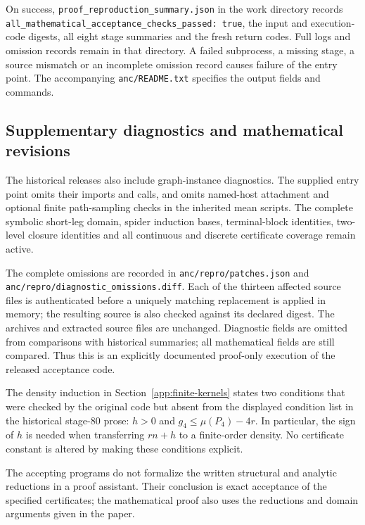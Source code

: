 On success, \nolinkurl{proof_reproduction_summary.json} in the work
directory records
\nolinkurl{all_mathematical_acceptance_checks_passed: true}, the input
and execution-code digests, all eight stage summaries and the fresh
return codes. Full logs and omission records remain in that directory.
A failed subprocess, a missing stage, a source mismatch or an incomplete
omission record causes failure of the entry point. The accompanying
\nolinkurl{anc/README.txt} specifies the output fields and commands.

\subsection{Supplementary diagnostics and mathematical revisions}
The historical releases also include graph-instance diagnostics. The
supplied entry point omits their imports and calls, and omits named-host
attachment and optional finite path-sampling checks in the inherited
mean scripts. The complete symbolic short-leg domain, spider induction
bases, terminal-block identities, two-level closure identities and all
continuous and discrete certificate coverage remain active.

The complete omissions are recorded in
\nolinkurl{anc/repro/patches.json} and
\nolinkurl{anc/repro/diagnostic_omissions.diff}. Each of the thirteen
affected source files is authenticated before a uniquely matching
replacement is applied in memory; the resulting source is also checked
against its declared digest. The archives and extracted source files
are unchanged. Diagnostic fields are omitted from comparisons with
historical summaries; all mathematical fields are still compared.
Thus this is an explicitly documented proof-only execution of the
released acceptance code.

The density induction in Section~\ref{app:finite-kernels} states two
conditions that were checked by the original code but absent from the
displayed condition list in the historical stage-80 prose:
$h>0$ and $g_4\le\mu(P_4)-4r$. In particular, the sign of $h$ is needed
when transferring $rn+h$ to a finite-order density. No certificate
constant is altered by making these conditions explicit.

The accepting programs do not formalize the written structural and
analytic reductions in a proof assistant. Their conclusion is exact
acceptance of the specified certificates; the mathematical proof also
uses the reductions and domain arguments given in the paper.
